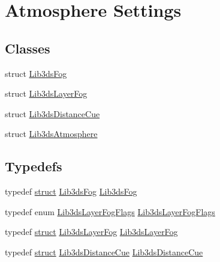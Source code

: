 \hypertarget{group__atmosphere}{\section{Atmosphere Settings}
\label{group__atmosphere}
}
\subsection*{Classes}
\begin{DoxyCompactItemize}
\item 
struct \hyperlink{struct_lib3ds_fog}{Lib3ds\-Fog}
\item 
struct \hyperlink{struct_lib3ds_layer_fog}{Lib3ds\-Layer\-Fog}
\item 
struct \hyperlink{struct_lib3ds_distance_cue}{Lib3ds\-Distance\-Cue}
\item 
struct \hyperlink{struct_lib3ds_atmosphere}{Lib3ds\-Atmosphere}
\end{DoxyCompactItemize}
\subsection*{Typedefs}
\begin{DoxyCompactItemize}
\item 
typedef \hyperlink{sdlgamepad_8dox_aba655c5729da86df745f0c8e7f9ba8d2}{struct} \hyperlink{struct_lib3ds_fog}{Lib3ds\-Fog} \hyperlink{group__atmosphere_ga535f2ed79f887427106dd66660b2d761}{Lib3ds\-Fog}
\item 
typedef enum \hyperlink{group__atmosphere_ga97509972c1ecfa3be722d20913a7ecea}{Lib3ds\-Layer\-Fog\-Flags} \hyperlink{group__atmosphere_ga908e92770698e21466f8797cefb026c0}{Lib3ds\-Layer\-Fog\-Flags}
\item 
typedef \hyperlink{sdlgamepad_8dox_aba655c5729da86df745f0c8e7f9ba8d2}{struct} \hyperlink{struct_lib3ds_layer_fog}{Lib3ds\-Layer\-Fog} \hyperlink{group__atmosphere_ga0855ca24eb5e54e027da9515081e7d08}{Lib3ds\-Layer\-Fog}
\item 
typedef \hyperlink{sdlgamepad_8dox_aba655c5729da86df745f0c8e7f9ba8d2}{struct} \hyperlink{struct_lib3ds_distance_cue}{Lib3ds\-Distance\-Cue} \hyperlink{group__atmosphere_gacf8a7ebc9666452b13e6051cfae4a0ff}{Lib3ds\-Distance\-Cue}
\end{DoxyCompactItemize}
